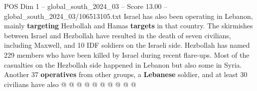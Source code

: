 \begin{textsample}{POS Dim 1 – global\_south\_2024\_03 – Score 13.00 – global\_south\_2024\_03/106513105.txt}
Israel has also been operating in Lebanon, mainly \textbf{targeting} Hezbollah and Hamas \textbf{targets} in that country.
The skirmishes between Israel and Hezbollah have resulted in the death of seven civilians, including Maxwell, and 10 IDF soldiers on the Israeli side.
Hezbollah has named 229 members who have been killed by Israel during recent flare-ups.
Most of the casualties on the Hezbollah side happened in Lebanon but also some in Syria.
Another 37 \textbf{operatives} from other groups, a \textbf{Lebanese} soldier, and at least 30 civilians have also @ @ @ @ @ @ @ @ @ @

\end{textsample}
